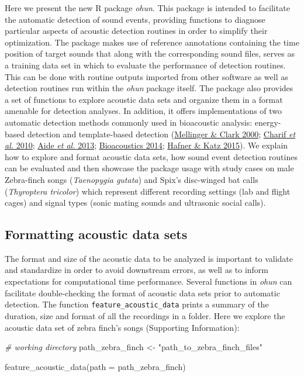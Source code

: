 \documentclass[
]{article}
\newenvironment{Shaded}{\begin{snugshade}}{\end{snugshade}}
\newcommand{\AttributeTok}[1]{\textcolor[rgb]{0.77,0.63,0.00}{#1}}
\newcommand{\CommentTok}[1]{\textcolor[rgb]{0.56,0.35,0.01}{\textit{#1}}}
\newcommand{\FunctionTok}[1]{\textcolor[rgb]{0.00,0.00,0.00}{#1}}
\newcommand{\NormalTok}[1]{#1}
\newcommand{\OtherTok}[1]{\textcolor[rgb]{0.56,0.35,0.01}{#1}}
\newcommand{\StringTok}[1]{\textcolor[rgb]{0.31,0.60,0.02}{#1}}
\begin{document}
Here we present the new R package \emph{ohun}. This package is intended
to facilitate the automatic detection of sound events, providing
functions to diagnose particular aspects of acoustic detection routines
in order to simplify their optimization. The package makes use of
reference annotations containing the time position of target sounds that
along with the corresponding sound files, serves as a training data set
in which to evaluate the performance of detection routines. This can be
done with routine outputs imported from other software as well as
detection routines run within the \emph{ohun} package itself. The
package also provides a set of functions to explore acoustic data sets
and organize them in a format amenable for detection analyses. In
addition, it offers implementations of two automatic detection methods
commonly used in bioacoustic analysis: energy-based detection and
template-based detection
(\protect\hyperlink{ref-mellinger2000}{Mellinger \& Clark 2000};
\protect\hyperlink{ref-Charif2010}{Charif \emph{et al.} 2010};
\protect\hyperlink{ref-aide2013}{Aide \emph{et al.} 2013};
\protect\hyperlink{ref-avi2014}{Bioacoustics 2014};
\protect\hyperlink{ref-Hafner2015}{Hafner \& Katz 2015}). We explain how
to explore and format acoustic data sets, how sound event detection
routines can be evaluated and then showcase the package usage with study
cases on male Zebra-finch songs (\emph{Taenopygia gutata}) and Spix's
disc-winged bat calls (\emph{Thyroptera tricolor}) which represent
different recording settings (lab and flight cages) and signal types
(sonic mating sounds and ultrasonic social calls).

\hypertarget{formatting-acoustic-data-sets}{%
\subsection{Formatting acoustic data
sets}\label{formatting-acoustic-data-sets}}

The format and size of the acoustic data to be analyzed is important to
validate and standardize in order to avoid downstream errors, as well as
to inform expectations for computational time performance. Several
functions in \emph{ohun} can facilitate double-checking the format of
acoustic data sets prior to automatic detection. The function
\texttt{feature\_acoustic\_data} prints a summary of the duration, size
and format of all the recordings in a folder. Here we explore the
acoustic data set of zebra finch's songs (Supporting Information):

\begin{Shaded}
\begin{Highlighting}[]
\CommentTok{\# working directory}
\NormalTok{path\_zebra\_finch }\OtherTok{\textless{}{-}} \StringTok{"path\_to\_zebra\_finch\_files"}

\FunctionTok{feature\_acoustic\_data}\NormalTok{(}\AttributeTok{path =}\NormalTok{ path\_zebra\_finch)}
\end{Highlighting}
\end{Shaded}
\end{document}
